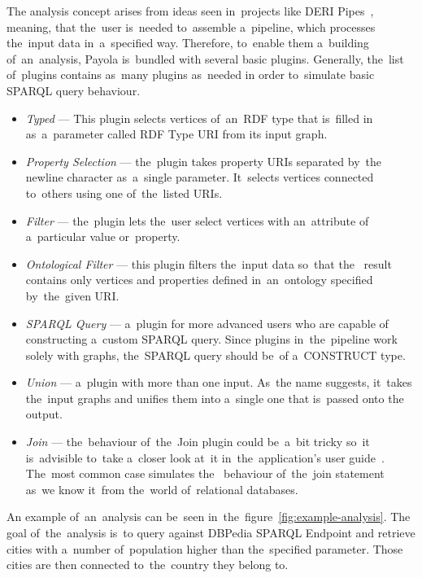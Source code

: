 The analysis concept arises from ideas seen in~projects like DERI 
Pipes~\cite{deri-pipes}, meaning, that the~user is~needed to~assemble a~pipeline,
which processes the~input data in~a~specified way. Therefore, to~enable them a~building of~an~analysis, Payola is~bundled with several basic 
plugins. Generally, the~list of~plugins contains as~many plugins as~needed
in order to~simulate basic SPARQL query behaviour.

\begin{itemize}
  \item \emph{Typed} --- This plugin selects vertices of~an~RDF type that is~filled in
  as~a~parameter called RDF Type URI from its input graph.
  
  \item \emph{Property Selection} --- the~plugin takes property URIs separated by~the
  newline character as~a~single parameter. It~selects vertices connected
  to~others using one of~the~listed URIs.
  
  \item \emph{Filter} --- the~plugin lets the~user select vertices with an~attribute of
  a~particular value or~property.
 
  \item \emph{Ontological Filter} --- this plugin filters the~input data so~that the~  result contains only vertices and properties defined in~an~ontology specified 
  by~the~given URI.
  
  \item \emph{SPARQL Query} --- a~plugin for more advanced users who are capable of~  constructing a~custom SPARQL query. Since plugins in~the~pipeline work solely with 
  graphs, the~SPARQL query should be~of a~CONSTRUCT type.
  
  \item \emph{Union} --- a~plugin with more than one input. As~the name suggests, it~takes 
  the~input graphs and unifies them into a~single one that is~passed onto the~  output.
  
  \item \emph{Join} --- the~behaviour of~the~Join plugin could be~a~bit tricky so~it is~advisible
  to~take a~closer look at~it in~the~application's 
  user guide~\cite{payola:ug:join-plugin}. The~most common case simulates the~  behaviour of~the~join statement as~we know it~from the~world of~relational 
  databases.
  
\end{itemize}

An example of~an~analysis can be~seen in~the~figure~\ref{fig:example-analysis}.
The goal of~the~analysis is~to query against DBPedia SPARQL Endpoint and 
retrieve cities with a~number of~population higher than the~specified parameter. 
Those cities are then connected to~the~country they belong to.

